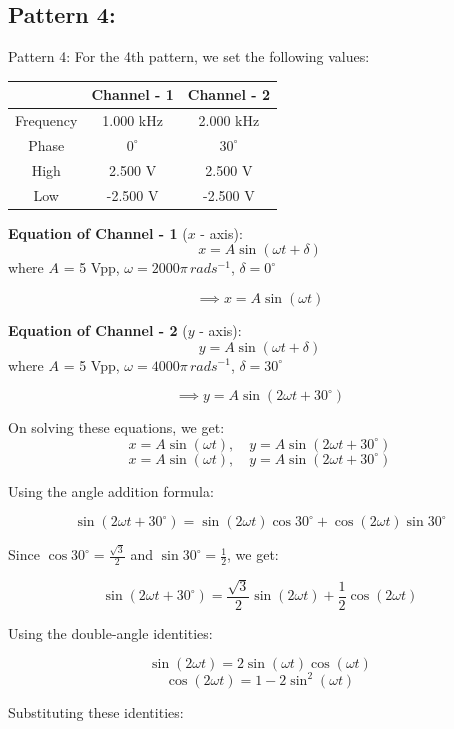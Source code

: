 \documentclass[12pt]{article}
\begin{document}
\subsection{Pattern 4:}Pattern 4:
For the 4th pattern, we set the following values:
\begin{table}[H]
    \centering
    \begin{tabular}{|c|c|c|}
    \hline
        & \textbf{Channel - 1} & \textbf{Channel - 2}\\
    \hline
    Frequency & 1.000 kHz & 2.000 kHz\\
    \hline
    Phase     & $0^{\circ}$ & $30^{\circ}$\\
    \hline
    High      & 2.500 V & 2.500 V\\
    \hline
    Low       & -2.500 V & -2.500 V\\
    \hline
    \end{tabular}
\end{table}

\textbf{Equation of Channel - 1} ($x$ - axis):
\[
x = A \sin{\left(\omega t + \delta\right)}
\]
where $A$ = 5 Vpp, $\omega = 2000 \pi \, rad s^{-1}$, $\delta = 0^{\circ}$

\[
\implies x = A \sin{\left(\omega t\right)}
\]

\textbf{Equation of Channel - 2} ($y$ - axis):
\[
y = A \sin{\left(\omega t + \delta\right)}
\]
where $A$ = 5 Vpp, $\omega = 4000 \pi \, rad s^{-1}$, $\delta = 30^{\circ}$

\[
\implies y = A \sin{\left(2\omega t + 30^\circ\right)}
\]

On solving these equations, we get:
\[
x = A \sin{\left(\omega t\right)}, \quad y = A \sin{\left(2 \omega t + 30^\circ\right)}
\]
\[
x = A \sin (\omega t), \quad y = A \sin (2\omega t + 30^\circ)
\]

Using the angle addition formula:

\[
\sin(2\omega t + 30^\circ) = \sin(2\omega t)\cos 30^\circ + \cos(2\omega t)\sin 30^\circ
\]

Since \( \cos 30^\circ = \frac{\sqrt{3}}{2} \) and \( \sin 30^\circ = \frac{1}{2} \), we get:

\[
\sin(2\omega t + 30^\circ) = \frac{\sqrt{3}}{2} \sin(2\omega t) + \frac{1}{2} \cos(2\omega t)
\]

Using the double-angle identities:

\[
\sin(2\omega t) = 2 \sin(\omega t)\cos(\omega t)
\]
\[
\cos(2\omega t) = 1 - 2\sin^2(\omega t)
\]

Substituting these identities:
\end{document}
